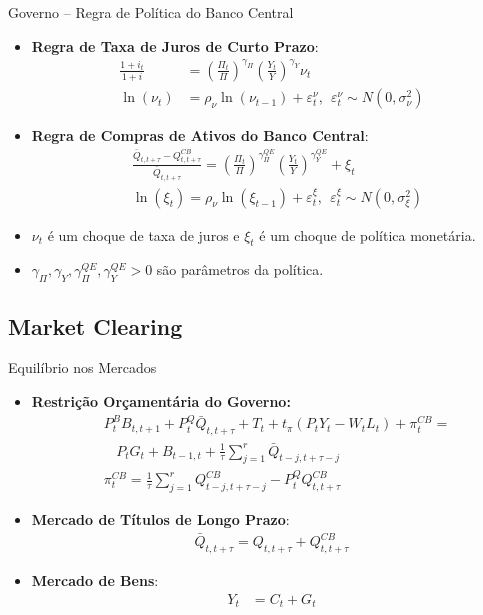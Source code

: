 \documentclass{beamer}
\begin{document}
\begin{frame}{Governo -- Regra de Política do Banco Central}
    \begin{itemize}
        \item \textbf{Regra de Taxa de Juros de Curto Prazo}:
        \begin{align*}
            \frac{1 + i_t}{1 + i} &= \left(\frac{\Pi_t}{\Pi}\right)^{\gamma_\Pi}\left(\frac{Y_t}{Y}\right)^{\gamma_Y} \nu_t \tag{19}\\
            \ln(\nu_t) &= \rho_\nu \ln(\nu_{t-1}) + \varepsilon_t^\nu, ~~ \varepsilon_t^\nu \sim N(0, \sigma^2_\nu) \tag{20}
        \end{align*}
        \item \textbf{Regra de Compras de Ativos do Banco Central}:
        \begin{align*}
            &\frac{\bar Q_{t, t+\tau} - Q^{CB}_{t, t+\tau}}{\bar Q_{t, t+\tau}} = \left(\frac{\Pi_t}{\Pi}\right)^{\gamma^{QE}_\Pi}\left(\frac{Y_t}{Y}\right)^{\gamma^{QE}_Y} + \xi_t \tag{21}\\
            &\ln(\xi_t) = \rho_\nu \ln(\xi_{t-1}) + \varepsilon_t^\xi, ~~ \varepsilon_t^\xi \sim N(0, \sigma^2_\xi) \tag{22}
        \end{align*}
        \item \(\nu_t\) é um choque de taxa de juros e \(\xi_t\) é um choque de política monetária.
        \item $\gamma_\Pi, \gamma_Y, \gamma^{QE}_\Pi, \gamma^{QE}_Y > 0$ são parâmetros da política.
    \end{itemize}
\end{frame}

\subsection{Market Clearing}

\begin{frame}{Equilíbrio nos Mercados}
    \begin{itemize}
        \item \textbf{Restrição Orçamentária do Governo:}
        \begin{align*}
            &P_{t}^{B}B_{t,t+1}+P_{t}^{Q}\bar{Q}_{t,t+\tau}+T_{t}+t_{\pi}(P_{t}Y_{t}-W_{t}L_{t})+\pi_{t}^{C B}=\\
            & ~~~~ P_{t}G_{t}+B_{t-1,t}+{\frac{1}{\tau}}\sum_{j=1}^{r}\bar{Q}_{t-j,t+\tau-j}\\
            &\pi^{CB}_t = {\frac{1}{\tau}}\sum_{j=1}^{r}Q^{CB}_{t-j,t+\tau-j} - P^Q_tQ^{CB}_{t,t+\tau}
        \end{align*}
        \item \textbf{Mercado de Títulos de Longo Prazo}:
        \begin{align*}
            \bar Q_{t,t+\tau} = Q_{t,t+\tau} + Q^{CB}_{t,t+\tau} \tag{23}
        \end{align*}
        \item \textbf{Mercado de Bens}:
        \begin{align*}
            Y_t &= C_t + G_t \tag{24}
        \end{align*}
    \end{itemize}
\end{frame}
\end{document}
